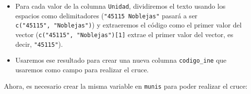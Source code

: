 \documentclass[
]{book}
\newenvironment{Shaded}{\begin{snugshade}}{\end{snugshade}}
\newcommand{\CommentTok}[1]{\textcolor[rgb]{0.56,0.35,0.01}{\textit{#1}}}
\newcommand{\ControlFlowTok}[1]{\textcolor[rgb]{0.13,0.29,0.53}{\textbf{#1}}}
\newcommand{\DecValTok}[1]{\textcolor[rgb]{0.00,0.00,0.81}{#1}}
\newcommand{\FunctionTok}[1]{\textcolor[rgb]{0.00,0.00,0.00}{#1}}
\newcommand{\NormalTok}[1]{#1}
\newcommand{\OtherTok}[1]{\textcolor[rgb]{0.56,0.35,0.01}{#1}}
\newcommand{\SpecialCharTok}[1]{\textcolor[rgb]{0.00,0.00,0.00}{#1}}
\newcommand{\StringTok}[1]{\textcolor[rgb]{0.31,0.60,0.02}{#1}}
\theoremstyle{definition}
\theoremstyle{definition}
\theoremstyle{definition}
\theoremstyle{definition}
\theoremstyle{remark}
\begin{document}
\begin{itemize}
\item
  Para cada valor de la columna \texttt{Unidad}, dividiremos el texto usando los
  espacios como delimitadores (\texttt{"45115\ Noblejas"} pasará a ser
  \texttt{c("45115",\ "Noblejas")}) y extraeremos el código como el primer valor del
  vector (\texttt{c("45115",\ "Noblejas"){[}1{]}} extrae el primer valor del vector, es
  decir, \texttt{"45115"}).
\item
  Usaremos ese resultado para crear una nueva columna \texttt{codigo\_ine} que
  usaremos como campo para realizar el cruce.
\end{itemize}

\begin{Shaded}
\end{Shaded}

Ahora, es necesario crear la misma variable en \texttt{munis} para poder realizar el
cruce:
\end{document}
